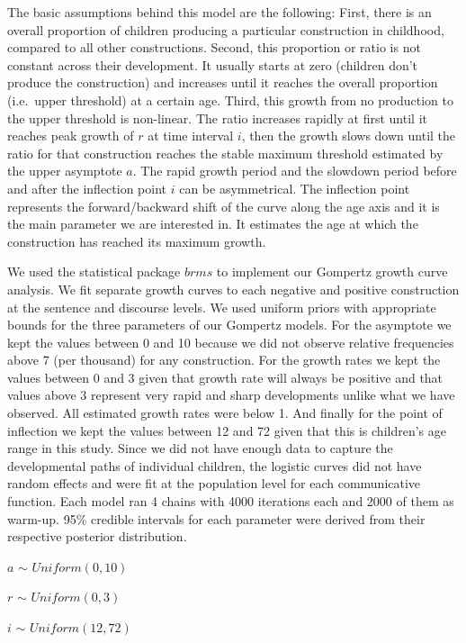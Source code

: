 \documentclass[
  man,floatsintext]{apa6}
\begin{document}
The basic assumptions behind this model are the following: First, there is an overall proportion of children producing a particular construction in childhood, compared to all other constructions. Second, this proportion or ratio is not constant across their development. It usually starts at zero (children don't produce the construction) and increases until it reaches the overall proportion (i.e.~upper threshold) at a certain age. Third, this growth from no production to the upper threshold is non-linear. The ratio increases rapidly at first until it reaches peak growth of \(r\) at time interval \(i\), then the growth slows down until the ratio for that construction reaches the stable maximum threshold estimated by the upper asymptote \(a\). The rapid growth period and the slowdown period before and after the inflection point \(i\) can be asymmetrical. The inflection point represents the forward/backward shift of the curve along the age axis and it is the main parameter we are interested in. It estimates the age at which the construction has reached its maximum growth.

We used the statistical package \(brms\) to implement our Gompertz growth curve analysis. We fit separate growth curves to each negative and positive construction at the sentence and discourse levels. We used uniform priors with appropriate bounds for the three parameters of our Gompertz models. For the asymptote we kept the values between 0 and 10 because we did not observe relative frequencies above 7 (per thousand) for any construction. For the growth rates we kept the values between 0 and 3 given that growth rate will always be positive and that values above 3 represent very rapid and sharp developments unlike what we have observed. All estimated growth rates were below 1. And finally for the point of inflection we kept the values between 12 and 72 given that this is children's age range in this study. Since we did not have enough data to capture the developmental paths of individual children, the logistic curves did not have random effects and were fit at the population level for each communicative function. Each model ran 4 chains with 4000 iterations each and 2000 of them as warm-up. 95\% credible intervals for each parameter were derived from their respective posterior distribution.

\(a\) \(\sim\) \(Uniform(0, 10)\)

\(r\) \(\sim\) \(Uniform(0, 3)\)

\(i\) \(\sim\) \(Uniform(12, 72)\)
\end{document}
